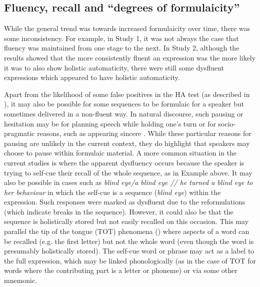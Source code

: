 \documentclass[output=paper]{langscibook}
\begin{document}
\subsection{Fluency, recall and ``degrees of formulaicity''}\label{sec:cutler:4.2}
While the general trend was towards increased formulaicity over time, there was some inconsistency. For example, in Study 1, it was not always the case that fluency was maintained from one stage to the next. In Study 2, although the results showed that the more consistently fluent an expression was the more likely it was to also show holistic automaticity, there were still some dysfluent expressions which appeared to have holistic automaticity. 

Apart from the likelihood of some false positives in the HA test (as described in ), it may also be possible for some sequences to be formulaic for a speaker but sometimes delivered in a non-fluent way. In natural discourse, such pausing or hesitation may be for planning speech while holding one’s turn \citep{Wray2019} or for socio-pragmatic reasons, such as appearing sincere \citep{Bardovi-Harlig2019}. While these particular reasons for pausing are unlikely in the current context, they do highlight that speakers may choose to pause within formulaic material. A more common situation in the current studies is where the apparent dysfluency occurs because the speaker is trying to self-cue their recall of the whole sequence, as in Example  above. It may also be possible in cases such as \textit{blind eye\slash a blind eye // he turned a blind eye to her behaviour} in which the self-cue is a sequence (\textit{blind eye}) within the expression. Such responses were marked as dysfluent due to the reformulations (which indicate breaks in the sequence). However, it could also be that the sequence is holistically stored but not easily recalled on this occasion. This may parallel the tip of the tongue (TOT) phenomena (\citealt{EckeHall2013}) where aspects of a word can be recalled (e.g. the first letter) but not the whole word (even though the word is presumably holistically stored). The self-cue word or phrase may act as a label to the full expression, which may be linked phonologically (as in the case of TOT for words where the contributing part is a letter or phoneme) or via some other mnemonic.
\end{document}
